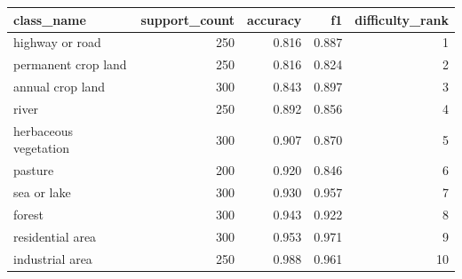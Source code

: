 \begin{tabular}{lrrrr}
\toprule
class\_name & support\_count & accuracy & f1 & difficulty\_rank \\
\midrule
highway or road & 250 & 0.816 & 0.887 & 1 \\
permanent crop land & 250 & 0.816 & 0.824 & 2 \\
annual crop land & 300 & 0.843 & 0.897 & 3 \\
river & 250 & 0.892 & 0.856 & 4 \\
herbaceous vegetation & 300 & 0.907 & 0.870 & 5 \\
pasture & 200 & 0.920 & 0.846 & 6 \\
sea or lake & 300 & 0.930 & 0.957 & 7 \\
forest & 300 & 0.943 & 0.922 & 8 \\
residential area & 300 & 0.953 & 0.971 & 9 \\
industrial area & 250 & 0.988 & 0.961 & 10 \\
\bottomrule
\end{tabular}
